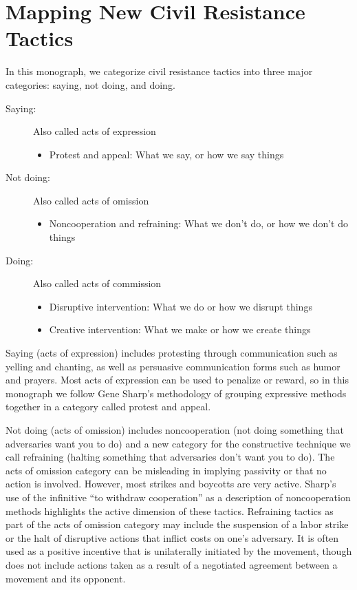 \documentclass[twoside,a4paper,12pt,fleqn,openany]{extbook}
\begin{document}
\chapter{Mapping New Civil Resistance Tactics}

In this monograph, we categorize civil resistance tactics into three major categories: saying, not doing, and doing.
\begin{description}
\item[Saying:] Also called acts of expression
\begin{itemize}
\item Protest and appeal: What we say, or how we say things
\end{itemize}
\item[Not doing:] Also called acts of omission
\begin{itemize}
\item Noncooperation and refraining: What we don’t do, or how we don’t do things
\end{itemize}
\item[Doing:] Also called acts of commission
\begin{itemize}
\item Disruptive intervention: What we do or how we disrupt things
\item Creative intervention: What we make or how we create things
\end{itemize}
\end{description}

Saying (acts of expression) includes protesting through communication such as yelling and chanting, as well as persuasive communication forms such as humor and prayers. Most acts of expression can be used to penalize or reward, so in this monograph we follow Gene Sharp’s methodology of grouping expressive methods together in a category called protest and appeal.

Not doing (acts of omission) includes noncooperation (not doing something that adversaries want you to do) and a new category for the constructive technique we call refraining (halting something that adversaries don’t want you to do). The acts of omission category can be misleading in implying passivity or that no action is involved. However, most strikes and boycotts are very active. Sharp’s use of the infinitive “to withdraw cooperation” as a description of noncooperation methods highlights the active dimension of these tactics. Refraining tactics as part of the acts of omission category may include the suspension of a labor strike or the halt of disruptive actions that inflict costs on one’s adversary. It is often used as a positive incentive that is unilaterally initiated by the movement, though does not include actions taken as a result of a negotiated agreement between a movement and its opponent.
\end{document}
